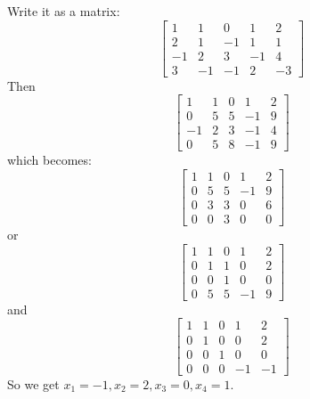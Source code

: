 \documentclass{article}
\begin{document}
    \begin{answer}
        Write it as a matrix:
            \begin{equation*}
                \begin{bmatrix}
                    1  & 1  & 0  & 1  & 2  \\
                    2  & 1  & -1 & 1  & 1  \\
                    -1 & 2  & 3  & -1 & 4  \\
                    3  & -1 & -1 & 2  & -3   
                \end{bmatrix}
            \end{equation*}
        Then
            \begin{equation*}
                \begin{bmatrix}
                    1  & 1 & 0 & 1  & 2 \\
                    0  & 5 & 5 & -1 & 9 \\
                    -1 & 2 & 3 & -1 & 4 \\
                    0  & 5 & 8 & -1 & 9   
                \end{bmatrix}
            \end{equation*}
        which becomes:
            \begin{equation*}
                \begin{bmatrix}
                    1 & 1 & 0 & 1  & 2 \\
                    0 & 5 & 5 & -1 & 9 \\
                    0 & 3 & 3 & 0  & 6 \\
                    0 & 0 & 3 & 0  & 0   
                \end{bmatrix}
            \end{equation*}
        or
            \begin{equation*}
                \begin{bmatrix}
                    1 & 1 & 0 & 1  & 2 \\
                    0 & 1 & 1 & 0  & 2 \\
                    0 & 0 & 1 & 0  & 0 \\
                    0 & 5 & 5 & -1 & 9   
                \end{bmatrix}
            \end{equation*}
        and
            \begin{equation*}
                \begin{bmatrix}
                    1 & 1 & 0 & 1  & 2  \\
                    0 & 1 & 0 & 0  & 2  \\
                    0 & 0 & 1 & 0  & 0  \\
                    0 & 0 & 0 & -1 & -1   
                \end{bmatrix}
            \end{equation*}
        So we get $x_{1} = -1, x_{2} = 2, x_{3} = 0, x_{4} = 1$.
    \end{answer}
\end{document}
